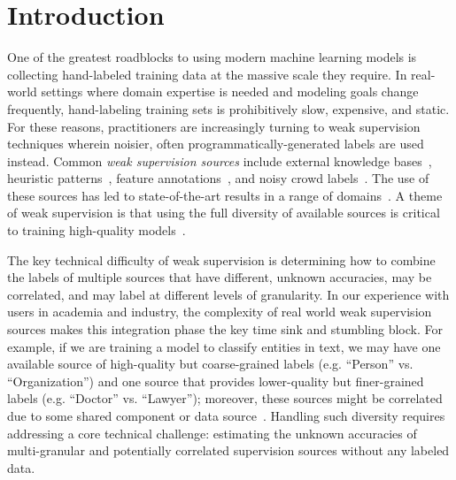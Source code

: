 \documentclass[letterpaper]{article}
\begin{document}
\section{Introduction}
\label{sec:intro}
One of the greatest roadblocks to using modern machine learning models is collecting hand-labeled training data at the massive scale they require.
In real-world settings where domain expertise is needed and modeling goals change frequently, hand-labeling training sets is prohibitively slow, expensive, and static.
For these reasons, practitioners are increasingly turning to weak supervision techniques wherein noisier, often programmatically-generated labels are used instead.
Common \textit{weak supervision sources} include external knowledge bases~\cite{mintz2009distant,zhang:cacm17,craven:ismb99,takamatsu:acl12}, heuristic patterns~\cite{gupta2014improved,ratner2018snorkel}, feature annotations~\cite{mann2010generalized,zaidan:emnlp08}, and noisy crowd labels~\cite{karger2011iterative,dawid1979maximum}. The use of these sources has led to state-of-the-art results in a range of domains~\cite{zhang:cacm17,xiao2015learning}.
A theme of weak supervision is that using the full diversity of available sources is critical to training high-quality models~\cite{ratner2018snorkel,zhang:cacm17}.

The key technical difficulty of weak supervision is determining how to combine the labels of multiple sources that have different, unknown accuracies, may be correlated, and may label at different levels of granularity.
In our experience with users in academia and industry, the complexity of real world weak supervision sources makes this integration phase the key time sink and stumbling block.
For example, if we are training a model to classify entities in text, we may have one available source of high-quality but coarse-grained labels (e.g. ``Person'' vs. ``Organization'') and one source that provides lower-quality but finer-grained labels (e.g. ``Doctor'' vs. ``Lawyer''); moreover, these sources might be correlated due to some shared component or data source~\cite{bach2017learning,varma2017inferring}.
Handling such diversity requires addressing a core technical challenge: estimating the unknown accuracies of multi-granular and potentially correlated supervision sources without any labeled data.
\end{document}
